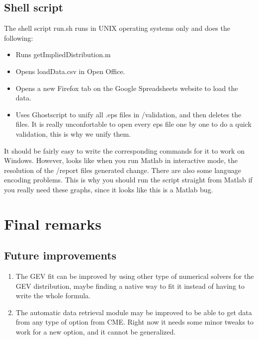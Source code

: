 \documentclass[10pt,a4paper]{book}
\begin{document}
\subsection{Shell script}

The shell script run.sh runs in UNIX operating systems only and does the following:

\begin{itemize}
  \item Runs getImpliedDistribution.m
  \item Opens loadData.csv in Open Office.
  \item Opens a new Firefox tab on the Google Spreadsheets website to load the data.
  \item Uses Ghostscript to unify all .eps files in /validation, and then deletes the files. It is really unconfortable to open every eps file one by one to do a quick validation, this is why we unify them.
\end{itemize}

It should be fairly easy to write the corresponding commands for it to work on Windows. However, looks like when you run Matlab in interactive mode, the resolution of the /report files generated change. There are also some language encoding problems. This is why you should run the script straight from Matlab if you really need these graphs, since it looks like this is a Matlab bug.

\section{Final remarks}
\subsection{Future improvements}
\begin{enumerate}
\item The GEV fit can be improved by using other type of numerical solvers for the GEV distribution, maybe finding a native way to fit it instead of having to write the whole formula.
\item The automatic data retrieval module may be improved to be able to get data from any type of option from CME. Right now it needs some minor tweaks to work for a new option, and it cannot be generalized.
\end{enumerate}
\end{document}

